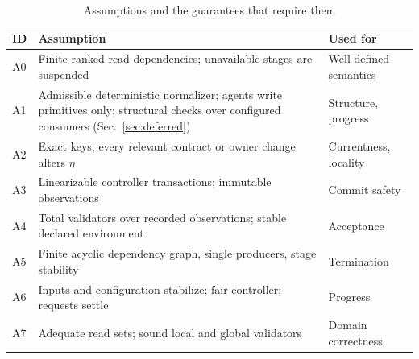\begin{table}[!t]
\centering
\caption{Assumptions and the guarantees that require them}\label{tab:assumptions}
\footnotesize\setlength{\tabcolsep}{3pt}
\begin{tabular}{@{}lP{50mm}l@{}}\toprule
ID & Assumption & Used for\\\midrule
A0 & Finite ranked read dependencies; unavailable stages are suspended & Well-defined semantics\\
A1 & Admissible deterministic normalizer; agents write primitives only; structural checks over configured consumers (Sec.~\ref{sec:deferred}) & Structure, progress\\
A2 & Exact keys; every relevant contract or owner change alters $\eta$ & Currentness, locality\\
A3 & Linearizable controller transactions; immutable observations & Commit safety\\
A4 & Total validators over recorded observations; stable declared environment & Acceptance\\
A5 & Finite acyclic dependency graph, single producers, stage stability & Termination\\
A6 & Inputs and configuration stabilize; fair controller; requests settle & Progress\\
A7 & Adequate read sets; sound local and global validators & Domain correctness\\\bottomrule
\end{tabular}
\end{table}
